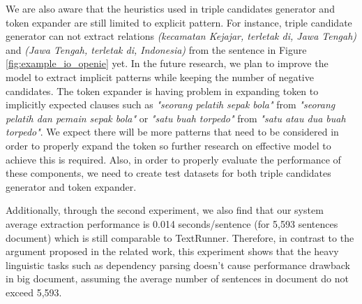 We are also aware that the heuristics used in triple candidates generator and token expander are still limited to explicit pattern. For instance, triple candidate generator can not extract relations \textit{(kecamatan Kejajar, terletak di, Jawa Tengah)} and \textit{(Jawa Tengah, terletak di, Indonesia)} from the sentence in Figure \ref{fig:example_io_openie} yet. In the future research, we plan to improve the model to extract implicit patterns while keeping the number of negative candidates. The token expander is having problem in expanding token to implicitly expected clauses such as \textit{"seorang pelatih sepak bola"} from \textit{"seorang pelatih dan pemain sepak bola"} or \textit{"satu buah torpedo"} from \textit{"satu atau dua buah torpedo"}. We expect there will be more patterns that need to be considered in order to properly expand the token so further research on effective model to achieve this is required. Also, in order to properly evaluate the performance of these components, we need to create test datasets for both triple candidates generator and token expander.

Additionally, through the second experiment, we also find that our system average extraction performance is 0.014 seconds/sentence (for 5,593 sentences document) which is still comparable to TextRunner\citep{banko2007open}. Therefore, in contrast to the argument proposed in the related work\citep{banko2007open}\citep{etzioni2011open}, this experiment shows that the heavy linguistic tasks such as dependency parsing doesn't cause performance drawback in big document, assuming the average number of sentences in document do not exceed 5,593.
